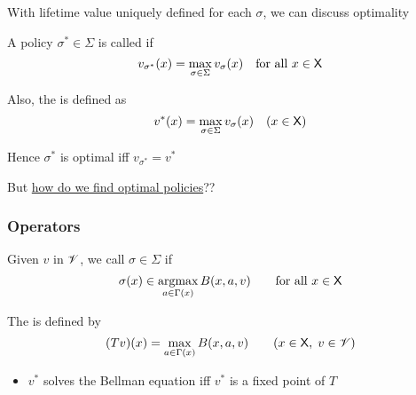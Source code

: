 \begin{frame}
    
    With lifetime value uniquely defined for each $\sigma$, we can discuss
    optimality

        \vspace{0.5em}
        \vspace{0.5em}
    A policy $\sigma^* \in \Sigma$ is called  if
    \begin{equation*}
        v_{\sigma^*}(x) = \max_{\sigma \in \Sigma} v_\sigma(x)
        \quad \text{for all } x \in \mathsf X
    \end{equation*}

        \vspace{0.5em}
        \vspace{0.5em}
    Also, the  is defined as 
    \begin{equation*}
        v^*(x) = \max_{\sigma \in \Sigma} v_\sigma(x)
        \quad (x \in \mathsf X)
    \end{equation*}

        \vspace{0.5em}
        \vspace{0.5em}
    Hence $\sigma^*$ is optimal iff $v_{\sigma^*} = v^*$

        \vspace{0.5em}
        \vspace{0.5em}

    But \underline{how do we find optimal policies}??

\end{frame}


\begin{frame}
    \frametitle{Operators}

    Given $v$ in $\mathscr V$, we call $\sigma \in \Sigma$   if 
    \begin{equation*}
        \sigma(x) \in \argmax_{a \in \Gamma(x)} B(x, a, v)
        \qquad \text{for all } x \in \Xsf
    \end{equation*}

              \vspace{0.5em}
    The  is defined by
    \begin{equation*}
        (T v)(x) = \max_{a \in \Gamma(x)} B(x, a, v)
        \qquad (x \in \mathsf X, \; v \in \mathscr V)
    \end{equation*}

              \vspace{0.5em}

    \begin{itemize}
        \item $v^*$ solves the Bellman equation iff $v^*$ is a fixed point of $T$
    \end{itemize}


\end{frame}


